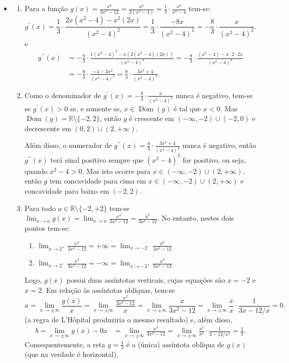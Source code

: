 \documentclass[12pt,a4paper]{article}
\newcommand*\dom[1]{\operatorname{Dom}\left(#1\right)}
\newcommand*\R{\mathbb{R}}
\begin{document}
\begin{enumerate}
\begin{itemize}
\begin{enumerate}
\end{enumerate}
\newpage
\item
\begin{enumerate}
\item Para a função $g(x) = \frac{x^2}{3x^2-12} = \frac{x^2}{3(x^2-4)} = \frac{1}{3} \cdot \frac{x^2}{x^2-4}$ tem-se:
\[
g^\prime(x)
= \frac{1}{3} \cdot \frac{2x(x^2-4) - x^2(2x)}{(x^2-4)^2}
= \frac{1}{3} \cdot \frac{-8x}{(x^2-4)^2}
= -\frac{8}{3} \cdot \frac{x}{(x^2-4)^2}.
\]
e
\begin{align*}
g^{\prime\prime}(x)
& = -\frac{8}{3} \cdot \frac{1(x^2-4)^2-x ( 2(x^2-4) (2x) )}{(x^2-4)^4}
  = -\frac{8}{3} \cdot \frac{(x^2-4)-x \cdot 2\cdot 2x}{(x^2-4)^3}\\
& = -\frac{8}{3} \cdot \frac{-4 - 3x^2}{(x^2-4)^3}
  = \frac{8}{3} \cdot \frac{3x^2 + 4}{(x^2-4)^3}.
\end{align*}

\item Como o denominador de $g^\prime(x) = -\frac{8}{3} \cdot \frac{x}{(x^2-4)^2}$ nunca é negativo, tem-se se $g^\prime(x) > 0$ se, e somente se, $x \in \dom{g}$ é tal que $x < 0$. Mas $\dom{g} = \R \setminus \{ -2, 2\}$, então $g$ é crescente em $(-\infty, -2) \cup (-2, 0)$ e decrescente em $(0,2) \cup (2, +\infty)$.

Além disso, o numerador de $g^{\prime\prime}(x) = \frac{8}{3} \cdot \frac{3x^2 + 4}{(x^2-4)^3}$ nunca é negativo, então $g^{\prime\prime}(x)$ terá sinal positivo sempre que $(x^2-4)^3$ for positivo, ou seja, quando $x^2-4 > 0$. Mas isto ocorre para
$x \in (-\infty, -2) \cup (2, +\infty)$, então $g$ tem concavidade para cima em $x \in (-\infty, -2) \cup (2, +\infty)$ e concavidade para baixo em $(-2,2)$.

\item Para todo $a \in \R \setminus\{ -2, +2 \}$ tem-se $\lim_{x\to a} g(x) = \lim_{x\to a} \frac{x^2}{3x^2-12} = \frac{a^2}{3a^2-12}$. No entanto, nestes dois pontos tem-se:
\begin{enumerate}
\item $\lim_{x\to 2^+} \frac{x^2}{3x^2-12}
= +\infty
= \lim_{x\to -2^-} \frac{x^2}{3x^2-12}$
\item $\lim_{x\to 2^-} \frac{x^2}{3x^2-12}
= -\infty
= \lim_{x\to -2^+} \frac{x^2}{3x^2-12}$
\end{enumerate}
Logo, $g(x)$ possui duas assíntotas verticais, cujas equações são $x = -2$ e $x = 2$.
Em relação às assíntotas oblíquas, tem-se
\[
a = \lim_{x\to \pm\infty} \frac{g(x)}{x}
= \lim_{x\to \pm\infty} \frac{ \frac{x^2}{3x^2-12} }{x}
= \lim_{x\to \pm\infty} \frac{x}{3x^2-12}
= \lim_{x\to \pm\infty} \frac{x}{x} \cdot \frac{1}{3x-12/x}
= 0.
\]
(a regra de L'Hôpital produziria o mesmo resultado) e, além disso,
\begin{align*}
b = \lim_{x\to \pm\infty} g(x) - 0x
& = \lim_{x\to \pm\infty} \frac{x^2}{3x^2-12}
  = \lim_{x\to \pm\infty} \frac{x^2}{x^2} \cdot \frac{1}{3-12/x^2}
  = \frac{1}{3}.
\end{align*}
Consequentemente, a reta $y = \frac{1}{3}$ é a (única) assíntota oblíqua de $g(x)$ (que na verdade é horizontal).


\end{enumerate}
\end{itemize}
\end{enumerate}
\end{document}
